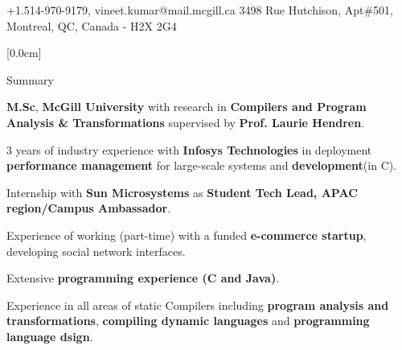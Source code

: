 \documentclass{resume} %
\begin{document}
\begin{hSubsection}{+1.514-970-9179, vineet.kumar@mail.mcgill.ca}
{%
}{3498 Rue Hutchison, Apt\#501, Montreal, QC, Canada - H2X 2G4}
\end{hSubsection}



[0.0cm]
\begin{rSection}{Summary}
\smallskip
\begin{lSubsection}
 \item \textbf{M.Sc}, \textbf{McGill University} with research in \textbf{Compilers and Program Analysis \& Transformations} supervised by \textbf{Prof. Laurie Hendren}. 
 \item 3 years of industry experience with \textbf{Infosys Technologies} in deployment \textbf{performance management} for large-scale systems and \textbf{development}(in C).
 \item Internship with \textbf{Sun Microsystems} as \textbf{Student Tech Lead, APAC region/Campus Ambassador}.
 \item Experience of working (part-time) with a funded \textbf{e-commerce startup}, developing social network interfaces.
 \item Extensive \textbf{programming experience (C and Java)}.
 \item Experience in all areas of static Compilers including \textbf{program analysis and transformations}, \textbf{compiling dynamic languages} and \textbf{programming language dsign}.
 
\end{lSubsection}
\end{rSection}
\end{document}
